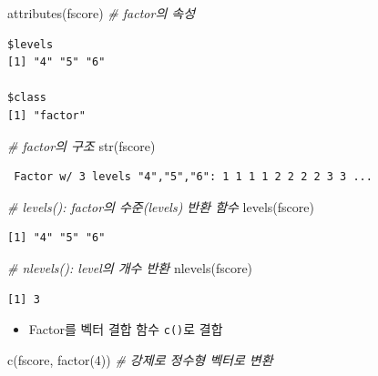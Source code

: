 \documentclass[
  11pt,
]{krantz}
\newenvironment{Shaded}{\begin{snugshade}}{\end{snugshade}}
\newcommand{\CommentTok}[1]{\textcolor[rgb]{0.37,0.37,0.37}{\textit{#1}}}
\newcommand{\DecValTok}[1]{\textcolor[rgb]{0.06,0.06,0.06}{#1}}
\newcommand{\FunctionTok}[1]{\textcolor[rgb]{0,0,0}{#1}}
\newcommand{\NormalTok}[1]{#1}
\providecommand{\tightlist}{%
  \setlength{\itemsep}{0pt}\setlength{\parskip}{0pt}}
\begin{document}
\begin{Shaded}
\begin{Highlighting}[]
\FunctionTok{attributes}\NormalTok{(fscore) }\CommentTok{\# factor의 속성}
\end{Highlighting}
\end{Shaded}

\begin{verbatim}
$levels
[1] "4" "5" "6"

$class
[1] "factor"
\end{verbatim}

\begin{Shaded}
\begin{Highlighting}[]
\CommentTok{\# factor의 구조}
\FunctionTok{str}\NormalTok{(fscore)}
\end{Highlighting}
\end{Shaded}

\begin{verbatim}
 Factor w/ 3 levels "4","5","6": 1 1 1 1 2 2 2 2 3 3 ...
\end{verbatim}

\begin{Shaded}
\begin{Highlighting}[]
\CommentTok{\# levels(): factor의 수준(levels) 반환 함수}
\FunctionTok{levels}\NormalTok{(fscore)}
\end{Highlighting}
\end{Shaded}

\begin{verbatim}
[1] "4" "5" "6"
\end{verbatim}

\begin{Shaded}
\begin{Highlighting}[]
\CommentTok{\# nlevels(): level의 개수 반환}
\FunctionTok{nlevels}\NormalTok{(fscore)}
\end{Highlighting}
\end{Shaded}

\begin{verbatim}
[1] 3
\end{verbatim}

\normalsize

\begin{itemize}
\tightlist
\item
  Factor를 벡터 결합 함수 \texttt{c()}로 결합
\end{itemize}

\footnotesize

\begin{Shaded}
\begin{Highlighting}[]
\FunctionTok{c}\NormalTok{(fscore, }\FunctionTok{factor}\NormalTok{(}\DecValTok{4}\NormalTok{)) }\CommentTok{\# 강제로 정수형 벡터로 변환}
\end{Highlighting}
\end{Shaded}
\end{document}
